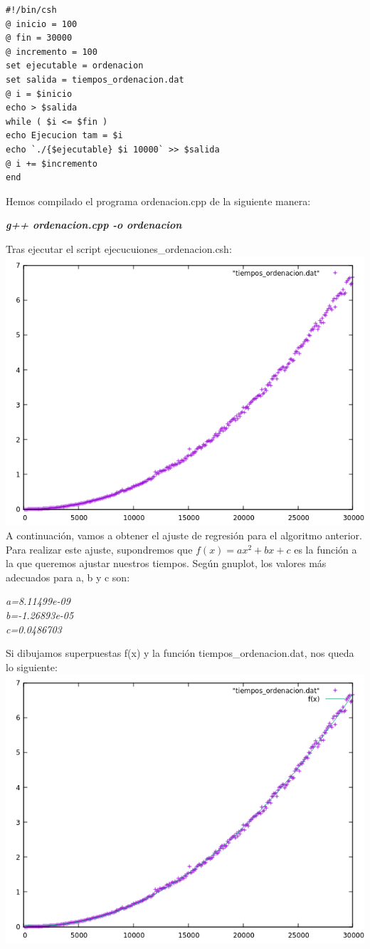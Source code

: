 \documentclass[a4paper,11pt]{article}
\begin{document}
\lstset{language=Bash, breaklines=true, basicstyle=\footnotesize}
\begin{lstlisting}[frame=single]
#!/bin/csh
@ inicio = 100
@ fin = 30000
@ incremento = 100
set ejecutable = ordenacion
set salida = tiempos_ordenacion.dat
@ i = $inicio
echo > $salida
while ( $i <= $fin )
echo Ejecucion tam = $i
echo `./{$ejecutable} $i 10000` >> $salida
@ i += $incremento
end
\end{lstlisting}
Hemos compilado el programa ordenacion.cpp de la siguiente manera:
\begin{center}
{\bf \it g++ ordenacion.cpp -o ordenacion}
\end{center}
Tras ejecutar el script ejecucuiones\_ordenacion.csh:
\includegraphics[scale=0.5]{1}
A continuación, vamos a obtener el ajuste de regresión para el algoritmo anterior. Para realizar este ajuste, supondremos que $f(x)=ax^2+bx+c$ es la función a la que queremos ajustar nuestros tiempos. Según gnuplot, los valores más adecuados para a, b y c son:
\begin{center}
{\it a=8.11499e-09 \\ b=-1.26893e-05 \\ c=0.0486703}
\end{center}
Si dibujamos superpuestas f(x) y la función tiempos\_ordenacion.dat, nos queda lo siguiente:
\includegraphics[scale=0.5]{2}


\nocite{*}
\end{document}
